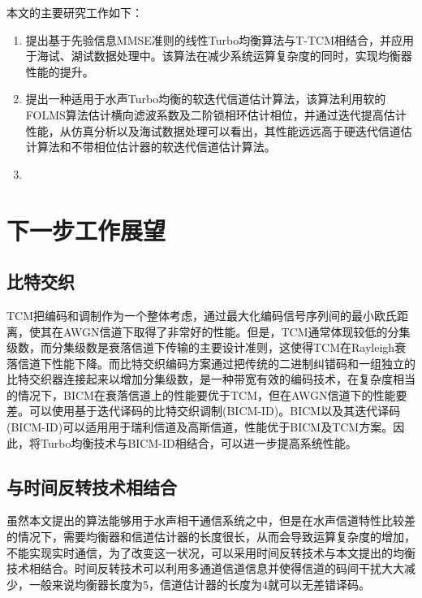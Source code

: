 本文的主要研究工作如下：
\begin{enumerate}
  \item
      提出基于先验信息MMSE准则的线性Turbo均衡算法与T-TCM相结合，并应用于海试、湖试数据处理中。该算法在减少系统运算复杂度的同时，实现均衡器性能的提升。
  \item
      提出一种适用于水声Turbo均衡的软迭代信道估计算法，该算法利用软的FOLMS算法估计横向滤波系数及二阶锁相环估计相位，并通过迭代提高估计性能，从仿真分析以及海试数据处理可以看出，其性能远远高于硬迭代信道估计算法和不带相位估计器的软迭代信道估计算法。
  \item
\end{enumerate}
\section{下一步工作展望}
\subsection{比特交织}
TCM\citep{ungerboeck1982,Coded2004,Schlegel2004}把编码和调制作为一个整体考虑，通过最大化编码信号序列间的最小欧氏距离，使其在AWGN信道下取得了非常好的性能。但是，TCM通常体现较低的分集级数，而分集级数是衰落信道下传输的主要设计准则，这使得TCM在Rayleigh衰落信道下性能下降。而比特交织编码方案\citep{zehavi1992,Akay2004,Alvarado,Caire,Sethuraman}通过把传统的二进制纠错码和一组独立的比特交织器连接起来以增加分集级数，是一种带宽有效的编码技术，在复杂度相当的情况下，BICM在衰落信道上的性能要优于TCM，但在AWGN信道下的性能要差。可以使用基于迭代译码的比特交织调制(BICM-ID)。BICM以及其迭代译码(BICM-ID)\citep{LeGoff2006}可以适用用于瑞利信道及高斯信道，性能优于BICM及TCM方案。因此，将Turbo均衡技术与BICM-ID相结合，可以进一步提高系统性能\citep{Antoine2003}。
\subsection{与时间反转技术相结合}
虽然本文提出的算法能够用于水声相干通信系统之中，但是在水声信道特性比较差的情况下，需要均衡器和信道估计器的长度很长，从而会导致运算复杂度的增加，不能实现实时通信，为了改变这一状况，可以采用时间反转技术与本文提出的均衡技术相结合。时间反转技术可以利用多通道信道信息并使得信道的码间干扰大大减少，一般来说均衡器长度为5，信道估计器的长度为4就可以无差错译码。
%
